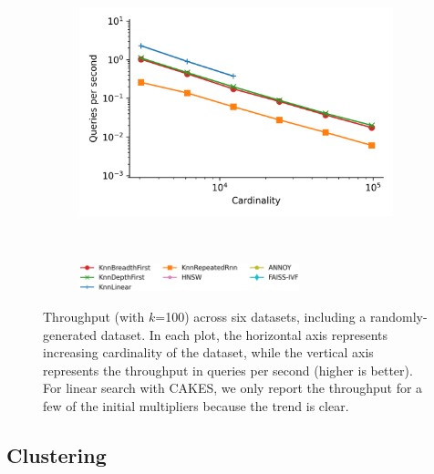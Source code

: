 \documentclass{article}
\begin{document}
\begin{figure}
\begin{subfigure}[b]{0.47\textwidth}
        \label{fig:supplement:silva-scaling}
    \end{subfigure}%
    \begin{subfigure}[b]{0.47\textwidth}
        \includegraphics[width=1.0\textwidth]{plots/radio-ml_Ball_100_throughput.png}
        \label{fig:supplement:radioml-scaling}
    \end{subfigure}%
    \\
    \begin{subfigure}[b]{0.94\textwidth}
        \centering
        \includegraphics[width=0.7\textwidth]{plots/legend.png}
        \label{fig:supplement:scaling-legend}
    \end{subfigure}%
    \caption{Throughput (with $k$=100) across six datasets, including a randomly-generated dataset.
    In each plot, the horizontal axis represents increasing cardinality of the dataset, while the vertical axis represents the throughput in queries per second (higher is better).
    For linear search with CAKES, we only report the throughput for a few of the initial multipliers because the trend is clear.}
    \label{fig:supplement:scaling-plots}
\end{figure}


\subsection{Clustering}
\end{document}
